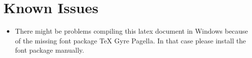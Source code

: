 \documentclass[ba,logo]{ivs-thesis}
\begin{document}
	\begingroup 
	
	\backmatter
		
	\printbibliography[heading=bibintoc]
	
	\listoffigures
	
	\listoftables
	
	\endgroup 
	
	\appendix
	
	\chapter{Known Issues}  
	\begin{itemize}
	\item There might be problems compiling this latex document in Windows because of the missing font package TeX Gyre Pagella. In that case please install the font package manually.
	\end{itemize}
	
	
\end{document}
